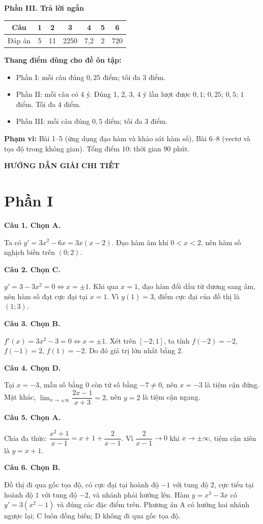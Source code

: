 \documentclass[12pt,a4paper]{article}
\newcommand{\loigiai}[1]{\par\medskip\Needspace{4\baselineskip}\noindent\textbf{#1}\par\nobreak}
\begin{document}
\textbf{Phần III. Trả lời ngắn}
\begin{center}
\renewcommand{\arraystretch}{1.5}
\begin{tabular}{|c|c|c|c|c|c|c|}\hline
Câu & 1 & 2 & 3 & 4 & 5 & 6\\\hline
Đáp án & 5 & 11 & 2250 & 7,2 & 2 & 720 \\\hline
\end{tabular}
\end{center}

\textbf{Thang điểm dùng cho đề ôn tập:}
\begin{itemize}[leftmargin=*,itemsep=3pt]
\item Phần I: mỗi câu đúng $0{,}25$ điểm; tối đa $3$ điểm.
\item Phần II: mỗi câu có 4 ý. Đúng 1, 2, 3, 4 ý lần lượt được $0{,}1$; $0{,}25$; $0{,}5$; $1$ điểm. Tối đa $4$ điểm.
\item Phần III: mỗi câu đúng $0{,}5$ điểm; tối đa $3$ điểm.
\end{itemize}
\textbf{Phạm vi:} Bài 1–5 (ứng dụng đạo hàm và khảo sát hàm số), Bài 6–8 (vectơ và tọa độ trong không gian).
Tổng điểm $10$; thời gian $90$ phút.

\newpage
\begin{center}\Large\textbf{HƯỚNG DẪN GIẢI CHI TIẾT}\end{center}
\section*{\large Phần I}
\loigiai{Câu 1. Chọn A.}
Ta có $y'=3x^2-6x=3x(x-2)$. Đạo hàm âm khi $0<x<2$, nên hàm số nghịch biến trên $(0;2)$.

\loigiai{Câu 2. Chọn C.}
$y'=3-3x^2=0\Leftrightarrow x=\pm1$. Khi qua $x=1$, đạo hàm đổi dấu từ dương sang âm, nên hàm số đạt cực đại tại $x=1$. Vì $y(1)=3$, điểm cực đại của đồ thị là $(1;3)$.

\loigiai{Câu 3. Chọn B.}
$f'(x)=3x^2-3=0\Leftrightarrow x=\pm1$. Xét trên $[-2;1]$, ta tính
$f(-2)=-2$, $f(-1)=2$, $f(1)=-2$. Do đó giá trị lớn nhất bằng $2$.

\loigiai{Câu 4. Chọn D.}
Tại $x=-3$, mẫu số bằng $0$ còn tử số bằng $-7\ne0$, nên $x=-3$ là tiệm cận đứng.
Mặt khác, $\lim_{x\to\pm\infty}\dfrac{2x-1}{x+3}=2$, nên $y=2$ là tiệm cận ngang.

\loigiai{Câu 5. Chọn A.}
Chia đa thức: $\dfrac{x^2+1}{x-1}=x+1+\dfrac2{x-1}$. Vì $\dfrac2{x-1}\to0$ khi $x\to\pm\infty$, tiệm cận xiên là $y=x+1$.

\loigiai{Câu 6. Chọn B.}
Đồ thị đi qua gốc tọa độ, có cực đại tại hoành độ $-1$ với tung độ $2$, cực tiểu tại hoành độ $1$ với tung độ $-2$, và nhánh phải hướng lên.
Hàm $y=x^3-3x$ có $y'=3(x^2-1)$ và đúng các đặc điểm trên. Phương án A có hướng hai nhánh ngược lại; C luôn đồng biến; D không đi qua gốc tọa độ.
\end{document}
